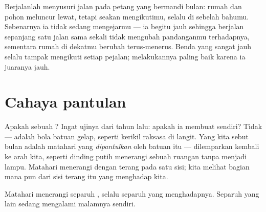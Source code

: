 \begin{example}\label{ex:g2:moon-in-the-sky:follows}
Berjalanlah menyusuri jalan pada petang yang bermandi  bulan:
rumah dan pohon meluncur lewat, tetapi  seakan mengikutimu,
selalu di sebelah bahumu. Sebenarnya ia tidak sedang mengejarmu --- ia
begitu jauh sehingga berjalan sepanjang satu jalan sama sekali tidak
mengubah pandanganmu terhadapnya, sementara rumah di dekatmu berubah
terus-menerus. Benda yang sangat jauh selalu tampak mengikuti setiap
pejalan;  melakukannya paling baik karena ia juaranya jauh.
\end{example}

\section{Cahaya pantulan}

\begin{example}\label{ex:g2:moon-in-the-sky:borrowed}
Apakah  sebuah ? Ingat ujinya dari tahun lalu:
apakah ia membuat  sendiri? Tidak ---  adalah bola
batuan gelap, seperti kerikil raksasa di langit. Yang kita sebut
 bulan adalah  matahari yang \emph{dipantulkan} oleh
batuan itu --- dilemparkan kembali ke arah kita, seperti dinding putih
menerangi sebuah ruangan tanpa menjadi lampu. Matahari menerangi 
dengan terang pada satu sisi; kita melihat bagian mana pun dari sisi
terang itu yang menghadap kita.
\end{example}

\begin{omfigure}

{\small Matahari menerangi separuh , selalu separuh yang
menghadapnya. Separuh yang lain sedang mengalami malamnya sendiri.}
\end{omfigure}

